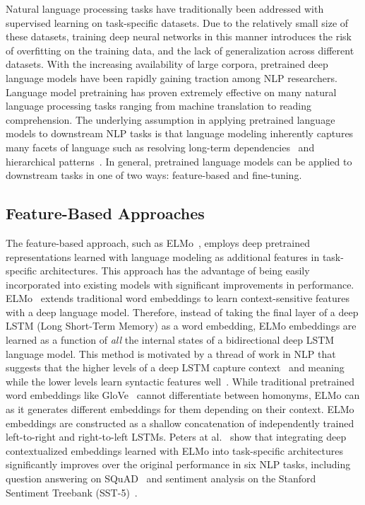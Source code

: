 Natural language processing tasks have traditionally been addressed with supervised learning on task-specific datasets.
Due to the relatively small size of these datasets, training deep neural networks in this manner introduces the risk of overfitting on the training data, and the lack of generalization across different datasets.
With the increasing availability of large corpora, pretrained deep language models have been rapidly gaining traction among NLP researchers.
Language model pretraining has proven extremely effective on many natural language processing tasks ranging from machine translation to reading comprehension.
The underlying assumption in applying pretrained language models to downstream NLP tasks is that language modeling inherently captures many facets of language such as resolving long-term dependencies~\cite{DBLP:journals/corr/LinzenDG16} and hierarchical patterns~\cite{DBLP:journals/corr/abs-1803-11138}.
In general, pretrained language models can be applied to downstream tasks in one of two ways: feature-based and fine-tuning.

\subsection{Feature-Based Approaches}

The feature-based approach, such as ELMo~\cite{peters2018deep}, employs deep pretrained representations learned with language modeling as additional features in task-specific architectures.
This approach has the advantage of being easily incorporated into existing models with significant improvements in performance.
ELMo~\cite{peters2018deep} extends traditional word embeddings to learn context-sensitive features with a deep language model.
Therefore, instead of taking the final layer of a deep LSTM (Long Short-Term Memory) as a word embedding, ELMo embeddings are learned as a function of \textit{all} the internal states of a bidirectional deep LSTM language model.
This method is motivated by a thread of work in NLP that suggests that the higher levels of a deep LSTM capture context~\cite{melamud2016context2vec} and meaning while the lower levels learn syntactic features well~\cite{belinkov2017neural}.
While traditional pretrained word embeddings like GloVe~\cite{pennington2014glove} cannot differentiate between homonyms, ELMo can as it generates different embeddings for them depending on their context.
ELMo embeddings are constructed as a shallow concatenation of independently trained left-to-right and right-to-left LSTMs.
Peters at al.~\cite{peters2018deep} show that integrating deep contextualized embeddings learned with ELMo into task-specific architectures significantly improves over the original performance in six NLP tasks, including question answering on SQuAD~\cite{rajpurkar2016squad} and sentiment analysis on the Stanford Sentiment Treebank (SST-5)~\cite{socher2013recursive}.

